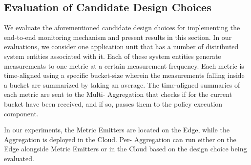 \subsection{Evaluation of Candidate Design Choices}
We evaluate the aforementioned candidate design choices for implementing the end-to-end monitoring mechanism and present results in this section. In our evaluations, we consider one application unit that has a number of distributed system entities associated with it. Each of these system entities generate measurements to one metric  at a certain measurement frequency. Each metric  is time-aligned using a specific bucket-size wherein the measurements falling inside a bucket are summarized by taking an average. The time-aligned summaries of each metric  are sent to the Multi- Aggregation that checks if  for the current bucket have been received, and if so, passes them to the policy execution component. 
\par In our experiments, the Metric Emitters are located on the Edge, while the  Aggregation is deployed in the Cloud. Per- Aggregation can run either on the Edge alongside Metric Emitters or in the Cloud based on the design choice being evaluated. 

